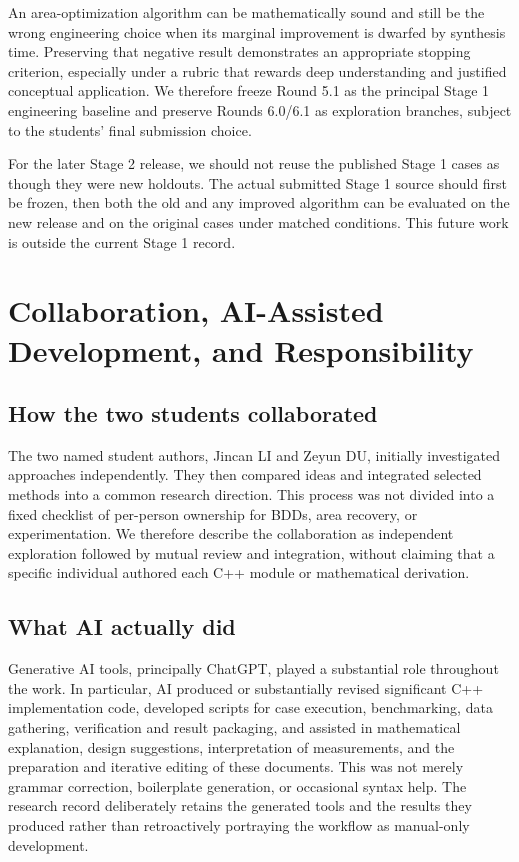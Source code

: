 An area-optimization algorithm can be mathematically sound and still be the wrong engineering choice when its marginal improvement is dwarfed by synthesis time. Preserving that negative result demonstrates an appropriate stopping criterion, especially under a rubric that rewards deep understanding and justified conceptual application. We therefore freeze Round 5.1 as the principal Stage 1 engineering baseline and preserve Rounds 6.0/6.1 as exploration branches, subject to the students' final submission choice.

For the later Stage 2 release, we should not reuse the published Stage 1 cases as though they were new holdouts. The actual submitted Stage 1 source should first be frozen, then both the old and any improved algorithm can be evaluated on the new release and on the original cases under matched conditions. This future work is outside the current Stage 1 record.


\section{Collaboration, AI-Assisted Development, and Responsibility}
\subsection{How the two students collaborated}
The two named student authors, Jincan LI and Zeyun DU, initially investigated approaches independently. They then compared ideas and integrated selected methods into a common research direction. This process was not divided into a fixed checklist of per-person ownership for BDDs, area recovery, or experimentation. We therefore describe the collaboration as independent exploration followed by mutual review and integration, without claiming that a specific individual authored each C++ module or mathematical derivation.

\subsection{What AI actually did}
Generative AI tools, principally ChatGPT, played a substantial role throughout the work. In particular, AI produced or substantially revised significant C++ implementation code, developed scripts for case execution, benchmarking, data gathering, verification and result packaging, and assisted in mathematical explanation, design suggestions, interpretation of measurements, and the preparation and iterative editing of these documents. This was not merely grammar correction, boilerplate generation, or occasional syntax help. The research record deliberately retains the generated tools and the results they produced rather than retroactively portraying the workflow as manual-only development.

